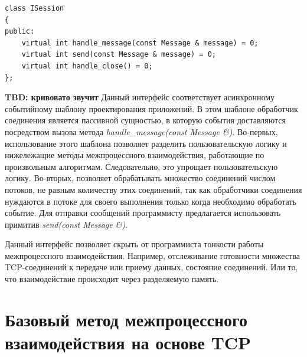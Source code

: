 \begin{lstlisting}[float=!h,caption={Интерфейс пользовательского обработчика соединений на C++},label={chapter31:ServiceHandlerInterface}]
class ISession
{
public:
	virtual int handle_message(const Message & message) = 0;
	virtual int send(const Message & message) = 0;
	virtual int handle_close() = 0;
};
\end{lstlisting}


\textbf{TBD: кривовато звучит}
Данный интерфейс соответствует асинхронному событийному шаблону проектирования приложений. В этом шаблоне обработчик соединения является пассивной сущностью, в которую события доставляются посредством вызова метода \textit{handle\_message(const Message \&)}. Во-первых, использование этого шаблона позволяет разделить пользовательскую логику и нижележащие методы межпроцессного взаимодействия, работающие по произвольным алгоритмам. Следовательно, это упрощает пользовательскую логику. Во-вторых, позволяет обрабатывать множество соединений числом потоков, не равным количеству этих соединений, так как обработчики соединения нуждаются в потоке для своего выполнения только когда необходимо обработать событие. Для отправки сообщений программисту предлагается использовать примитив \textit{send(const Message \&)}.

Данный интерфейс позволяет скрыть от программиста тонкости работы межпроцессного взаимодействия. Например, отслеживание готовности множества TCP-соединений к передаче или приему данных, состояние соединений. Или то, что взаимодействие происходит через разделяемую память.

\section{Базовый метод межпроцессного взаимодействия на основе TCP}\label{chapter31:PureTCP}

